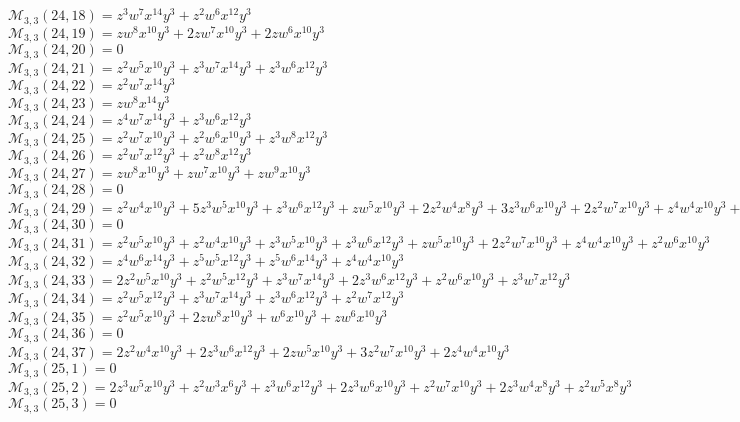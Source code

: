 $\mathcal{M}_{3,3}(24,18)=z^3w^7x^{14}y^3+z^2w^6x^{12}y^3$\\
$\mathcal{M}_{3,3}(24,19)=zw^8x^{10}y^3+2zw^7x^{10}y^3+2zw^6x^{10}y^3$\\
$\mathcal{M}_{3,3}(24,20)=0$\\
$\mathcal{M}_{3,3}(24,21)=z^2w^5x^{10}y^3+z^3w^7x^{14}y^3+z^3w^6x^{12}y^3$\\
$\mathcal{M}_{3,3}(24,22)=z^2w^7x^{14}y^3$\\
$\mathcal{M}_{3,3}(24,23)=zw^8x^{14}y^3$\\
$\mathcal{M}_{3,3}(24,24)=z^4w^7x^{14}y^3+z^3w^6x^{12}y^3$\\
$\mathcal{M}_{3,3}(24,25)=z^2w^7x^{10}y^3+z^2w^6x^{10}y^3+z^3w^8x^{12}y^3$\\
$\mathcal{M}_{3,3}(24,26)=z^2w^7x^{12}y^3+z^2w^8x^{12}y^3$\\
$\mathcal{M}_{3,3}(24,27)=zw^8x^{10}y^3+zw^7x^{10}y^3+zw^9x^{10}y^3$\\
$\mathcal{M}_{3,3}(24,28)=0$\\
$\mathcal{M}_{3,3}(24,29)=z^2w^4x^{10}y^3+5z^3w^5x^{10}y^3+z^3w^6x^{12}y^3+zw^5x^{10}y^3+2z^2w^4x^8y^3+3z^3w^6x^{10}y^3+2z^2w^7x^{10}y^3+z^4w^4x^{10}y^3+z^2w^5x^8y^3$\\
$\mathcal{M}_{3,3}(24,30)=0$\\
$\mathcal{M}_{3,3}(24,31)=z^2w^5x^{10}y^3+z^2w^4x^{10}y^3+z^3w^5x^{10}y^3+z^3w^6x^{12}y^3+zw^5x^{10}y^3+2z^2w^7x^{10}y^3+z^4w^4x^{10}y^3+z^2w^6x^{10}y^3$\\
$\mathcal{M}_{3,3}(24,32)=z^4w^6x^{14}y^3+z^5w^5x^{12}y^3+z^5w^6x^{14}y^3+z^4w^4x^{10}y^3$\\
$\mathcal{M}_{3,3}(24,33)=2z^2w^5x^{10}y^3+z^2w^5x^{12}y^3+z^3w^7x^{14}y^3+2z^3w^6x^{12}y^3+z^2w^6x^{10}y^3+z^3w^7x^{12}y^3$\\
$\mathcal{M}_{3,3}(24,34)=z^2w^5x^{12}y^3+z^3w^7x^{14}y^3+z^3w^6x^{12}y^3+z^2w^7x^{12}y^3$\\
$\mathcal{M}_{3,3}(24,35)=z^2w^5x^{10}y^3+2zw^8x^{10}y^3+w^6x^{10}y^3+zw^6x^{10}y^3$\\
$\mathcal{M}_{3,3}(24,36)=0$\\
$\mathcal{M}_{3,3}(24,37)=2z^2w^4x^{10}y^3+2z^3w^6x^{12}y^3+2zw^5x^{10}y^3+3z^2w^7x^{10}y^3+2z^4w^4x^{10}y^3$\\
$\mathcal{M}_{3,3}(25,1)=0$\\
$\mathcal{M}_{3,3}(25,2)=2z^3w^5x^{10}y^3+z^2w^3x^6y^3+z^3w^6x^{12}y^3+2z^3w^6x^{10}y^3+z^2w^7x^{10}y^3+2z^3w^4x^8y^3+z^2w^5x^8y^3$\\
$\mathcal{M}_{3,3}(25,3)=0$\\
